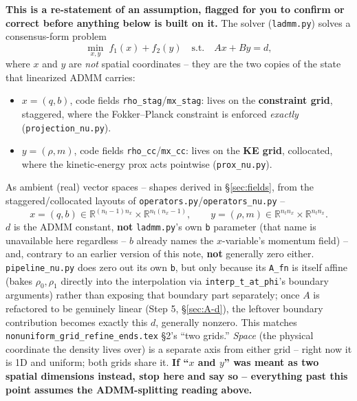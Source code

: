 \documentclass[11pt]{article}
\newcommand{\code}[1]{\texttt{#1}}
\begin{document}
\textbf{This is a re-statement of an assumption, flagged for you to confirm or correct
before anything below is built on it.} The solver (\code{ladmm.py}) solves a
consensus-form problem
\[
  \min_{x,y} \; f_1(x) + f_2(y) \quad \text{s.t.} \quad A x + B y = d,
\]
where $x$ and $y$ are \emph{not} spatial coordinates -- they are the two copies of the
state that linearized ADMM carries:
\begin{itemize}
  \item $x = (q,b)$, code fields \code{rho\_stag}/\code{mx\_stag}: lives on the
        \textbf{constraint grid}, staggered, where the Fokker--Planck constraint is
        enforced \emph{exactly} (\code{projection\_nu.py}).
  \item $y = (\rho,m)$, code fields \code{rho\_cc}/\code{mx\_cc}: lives on the
        \textbf{KE grid}, collocated, where the kinetic-energy prox acts pointwise
        (\code{prox\_nu.py}).
\end{itemize}
As ambient (real) vector spaces -- shapes derived in \S\ref{sec:fields}, from the
staggered/collocated layouts of \code{operators.py}/\code{operators\_nu.py} --
\begin{equation}
  \label{eq:xy-spaces}
  x = (q,b) \in \mathbb{R}^{(n_t-1)n_x} \times \mathbb{R}^{n_t(n_x-1)},
  \qquad
  y = (\rho,m) \in \mathbb{R}^{n_t n_x} \times \mathbb{R}^{n_t n_x}.
\end{equation}
$d$ is the ADMM constant, \textbf{not} \code{ladmm.py}'s own \code{b} parameter (that
name is unavailable here regardless -- $b$ already names the $x$-variable's momentum
field) -- and, contrary to an earlier version of this note, \textbf{not} generally zero
either. \code{pipeline\_nu.py} does zero out its own \code{b}, but only because its
\code{A\_fn} is itself affine (bakes $\rho_0,\rho_1$ directly into the interpolation via
\code{interp\_t\_at\_phi}'s boundary arguments) rather than exposing that boundary part
separately; once $A$ is refactored to be genuinely linear (Step 5, \S\ref{sec:A-d}), the
leftover boundary contribution becomes exactly this $d$, generally nonzero. This matches
\code{nonuniform\_grid\_refine\_ends.tex} \S2's ``two grids.'' \emph{Space}
(the physical coordinate the density lives over) is a separate axis from either grid --
right now it is 1D and uniform; both grids share it. \textbf{If ``$x$ and $y$'' was meant
as two spatial dimensions instead, stop here and say so -- everything past this point
assumes the ADMM-splitting reading above.}

\end{document}
